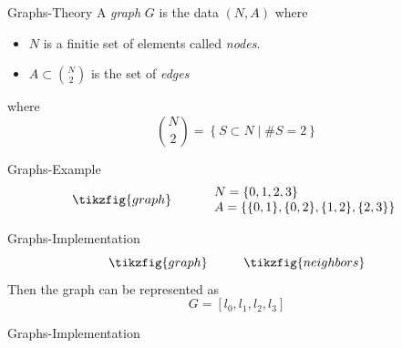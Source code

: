 \begin{frame}{Graphs-Theory}
	A \emph{graph} $G$ is the data $(N, A)$ where
	\begin{itemize}
		\item $N$ is a finitie set of elements called \emph{nodes}.
		\item $A \subset \binom{N}{2}$ is the set of \emph{edges}
	\end{itemize}
	where 
	\[
		\binom{N}{2}=
		\left\{
			S \subset N \mid \# S = 2
		\right\}
	\]
\end{frame}
%
\begin{frame}{Graphs-Example}
	\[
		\tikzfig{graph} \hspace{1cm}
		\begin{array}{l}
			N = \{0, 1, 2, 3\}\\
			A =
			\{
				\{0,1\}, \{0,2\}, \{1,2\}, \{2,3\}
			\}
		\end{array}
	\]
\end{frame}
\begin{frame}{Graphs-Implementation}
	\[
		\tikzfig{graph}
		\hspace{1cm}
		\tikzfig{neighbors}
	\]
	Then the graph can be represented as
	\[
		G= [l_0, l_1, l_2, l_3]
	\]
\end{frame}
%
\begin{frame}{Graphs-Implementation}
	
\end{frame}
